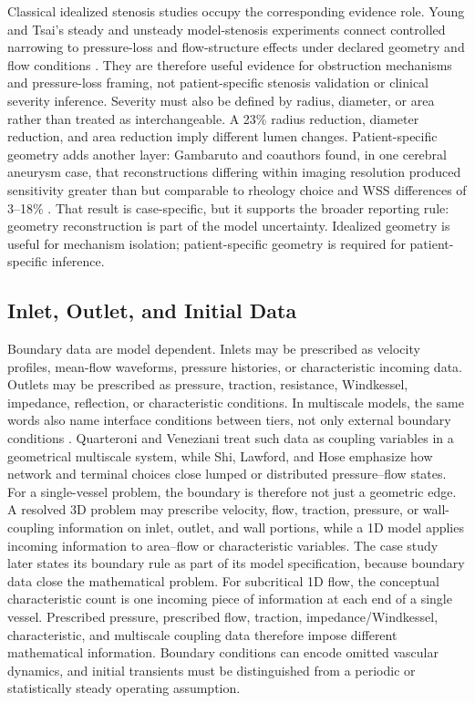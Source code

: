 Classical idealized stenosis studies occupy the corresponding evidence role.
Young and Tsai's steady and unsteady model-stenosis experiments connect
controlled narrowing to pressure-loss and flow-structure effects under declared
geometry and flow conditions
\cite{YoungTsai1973SteadyStenosis,YoungTsai1973UnsteadyStenosis}. They are
therefore useful evidence for obstruction mechanisms and pressure-loss framing,
not patient-specific stenosis validation or clinical severity inference.
Severity must also be defined by radius, diameter, or area rather than treated
as interchangeable. A 23\% radius reduction, diameter reduction, and area
reduction imply different lumen changes. Patient-specific geometry adds another
layer: Gambaruto and coauthors found, in one cerebral aneurysm case, that
reconstructions differing within imaging resolution produced sensitivity
greater than but comparable to rheology choice and WSS differences of 3--18\%
\cite{GambarutoEtAl2011GeometryRheologySensitivity}. That result is
case-specific, but it supports the broader reporting rule: geometry
reconstruction is part of the model uncertainty. Idealized geometry is useful
for mechanism isolation; patient-specific geometry is required for
patient-specific inference.

\subsection{Inlet, Outlet, and Initial Data}
\label{subsec:inlet-outlet-initial-data}

Boundary data are model dependent. Inlets may be prescribed as velocity
profiles, mean-flow waveforms, pressure histories, or characteristic incoming
data. Outlets may be prescribed as pressure, traction, resistance, Windkessel,
impedance, reflection, or characteristic conditions. In multiscale models, the
same words also name interface conditions between tiers, not only external
boundary conditions
\cite{QuarteroniVeneziani2003GeometricalMultiscale,ShiEtAl2011BloodFlowModelReview}.
Quarteroni and Veneziani treat such data as coupling variables in a
geometrical multiscale system, while Shi, Lawford, and Hose emphasize how
network and terminal choices close lumped or distributed pressure--flow states.
For a single-vessel problem, the boundary is therefore not just a geometric
edge. A resolved 3D problem may prescribe velocity, flow, traction, pressure,
or wall-coupling information on inlet, outlet, and wall portions, while a 1D
model applies incoming information to area--flow or characteristic variables.
The case study later states its boundary rule as part of its model
specification, because boundary data close the mathematical problem.
For subcritical 1D flow, the conceptual characteristic count is one incoming
piece of information at each end of a single vessel. Prescribed pressure,
prescribed flow, traction, impedance/Windkessel, characteristic, and multiscale
coupling data therefore impose different mathematical information. Boundary
conditions can encode omitted vascular dynamics, and initial transients must be
distinguished from a periodic or statistically steady operating assumption.

